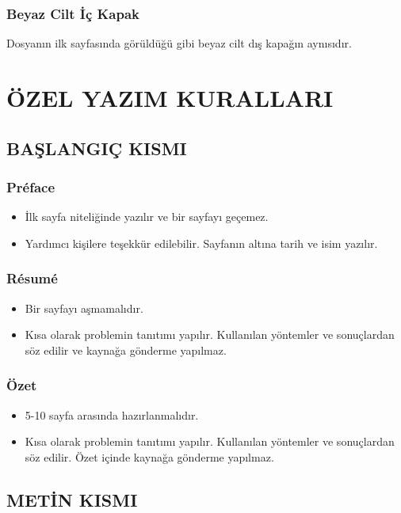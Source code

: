 \subsection{Beyaz Cilt İç Kapak}
Dosyanın ilk sayfasında görüldüğü gibi beyaz cilt dış kapağın aynısıdır.





\chapter{ÖZEL YAZIM KURALLARI}
\thispagestyle{empty}

\section{BAŞLANGIÇ KISMI}

\subsection{Préface}
\begin{itemize}
\item İlk sayfa niteliğinde yazılır ve bir sayfayı geçemez.
\item Yardımcı kişilere teşekkür edilebilir.
Sayfanın altına tarih ve isim yazılır.
\end{itemize}

\subsection{Résumé}
\begin{itemize}
\item Bir sayfayı aşmamalıdır.
\item Kısa olarak problemin tanıtımı yapılır. Kullanılan yöntemler ve sonuçlardan söz edilir ve kaynağa gönderme yapılmaz.
\end{itemize}

\subsection{Özet}
\begin{itemize}
\item 5-10 sayfa arasında hazırlanmalıdır.
\item Kısa olarak problemin tanıtımı yapılır. Kullanılan yöntemler ve sonuçlardan  söz edilir. Özet içinde kaynağa gönderme yapılmaz.
\end{itemize}

\section{METİN KISMI}

